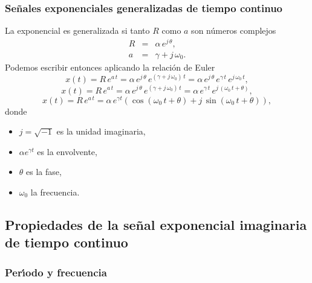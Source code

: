 \subsubsection{Se\~{n}ales exponenciales generalizadas de tiempo continuo}
La exponencial es generalizada si tanto $R$ como $a$ son n\'{u}meros complejos
\begin{eqnarray}
  R &=&\alpha \, e^{j \, \theta }, \\
  a &=&\gamma + j \, \omega_{0}.
\end{eqnarray}
Podemos escribir entonces aplicando la relaci\'{o}n de Euler
\begin{equation}
  x\left( t\right) = R \, e^{a \, t}=
  \alpha \, e^{j \, \theta } \, e^{(\gamma + j \, \omega_{0}) \, t} = 
  \alpha \, e^{j \, \theta } \, e^{\gamma \, t} \, e^{j \, \omega_{0} \, t},
\end{equation}
\begin{equation}
  x\left( t\right) = R \, e^{a \, t}=
  \alpha \, e^{j \, \theta } \, e^{(\gamma + j \, \omega_{0}) \, t} = 
  \alpha \, e^{\gamma \, t} \, e^{j \, (\omega_{0} \, t + \theta)},
\end{equation}
\begin{equation}
  x\left( t\right) = R \, e^{a \, t}=
  \alpha \, e^{\gamma t}
  \left( \cos \left( \omega_{0} \, t+\theta \right) +
    j \, \sin \left( \omega_{0} \, t+\theta \right) \right) ,
\end{equation}
donde
\begin{itemize}
\item $j=\sqrt{-1}$ es la unidad imaginaria,
\item $\alpha e^{\gamma t}$ es la envolvente,
\item $\theta$ es la fase,
\item $\omega_{0}$ la frecuencia.
\end{itemize}

\subsection{Propiedades de la se\~{n}al exponencial imaginaria de tiempo continuo}

\subsubsection{Per\'{\i}odo y frecuencia}


